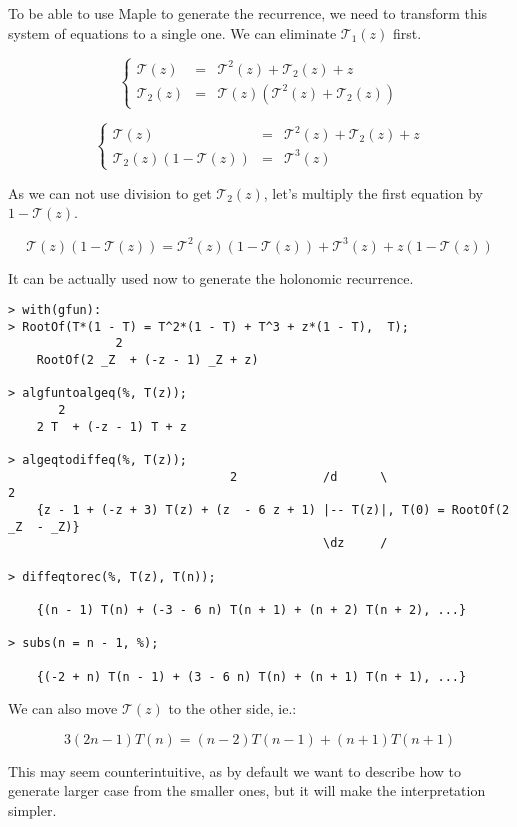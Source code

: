 \documentclass[final]{article}
\theoremstyle{definition}
\theoremstyle{remark}
\newcommand{\gf}[1]{\ensuremath{\mathcal{#1}}}
\begin{document}
To be able to use Maple to generate the recurrence, we need to transform this system of equations to a single one. We can eliminate \(\gf{T}_1(z)\) first.

\[\left\{\begin{array}{rcl}
            \gf{T}(z) &=& \gf{T}^2(z) + \gf{T}_2(z) + z\\
            \gf{T}_2(z) &=& \gf{T}(z)(\gf{T}^2(z) + \gf{T}_2(z))
\end{array}\right.\]

\[\left\{\begin{array}{rcl}
            \gf{T}(z) &=& \gf{T}^2(z) + \gf{T}_2(z) + z\\
            \gf{T}_2(z)(1 - \gf{T}(z)) &=& \gf{T}^3(z)
\end{array}\right.\]

As we can not use division to get \(\gf{T}_2(z)\), let's multiply the first equation by \(1 - \gf{T}(z)\).

\[\gf{T}(z)(1 - \gf{T}(z)) = \gf{T}^2(z)(1 - \gf{T}(z)) + \gf{T}^3(z) + z(1 - \gf{T}(z))\]

It can be actually used now to generate the holonomic recurrence.

\begin{lstlisting}
> with(gfun):
> RootOf(T*(1 - T) = T^2*(1 - T) + T^3 + z*(1 - T),  T);
               2
    RootOf(2 _Z  + (-z - 1) _Z + z)

> algfuntoalgeq(%, T(z));
       2
    2 T  + (-z - 1) T + z

> algeqtodiffeq(%, T(z));
                               2            /d      \                    2
    {z - 1 + (-z + 3) T(z) + (z  - 6 z + 1) |-- T(z)|, T(0) = RootOf(2 _Z  - _Z)}
                                            \dz     /

> diffeqtorec(%, T(z), T(n));

    {(n - 1) T(n) + (-3 - 6 n) T(n + 1) + (n + 2) T(n + 2), ...}

> subs(n = n - 1, %);

    {(-2 + n) T(n - 1) + (3 - 6 n) T(n) + (n + 1) T(n + 1), ...}
\end{lstlisting}

We can also move \(\gf{T}(z)\) to the other side, ie.:

\[3 (2 n - 1) T(n) = (n - 2) T(n - 1) + (n + 1) T(n + 1)\]

This may seem counterintuitive, as by default we want to describe how to generate larger case from the smaller ones, but it will make the interpretation simpler.
\end{document}
